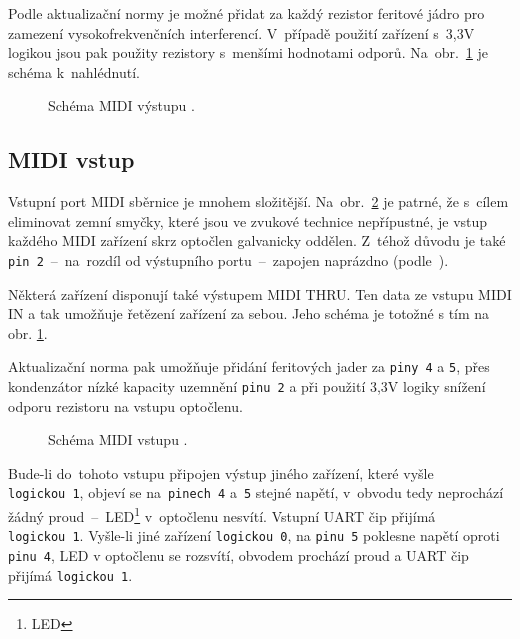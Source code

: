 Podle aktualizační normy \cite{MIDIupd} je možné přidat za každý rezistor feritové jádro pro zamezení vysokofrekvenčních interferencí. V~případě použití zařízení s~3,3\unit{V} logikou jsou pak použity rezistory s~menšími hodnotami odporů. Na~obr.~\ref{fig:schMIDIout} je schéma k~nahlédnutí.

\begin{figure}[h]
    \centering
    
    \caption{Schéma \acs{MIDI} výstupu \cite{MIDIspecs}.}
    \label{fig:schMIDIout}
\end{figure}

\subsection{MIDI vstup}



Vstupní port \acs{MIDI} sběrnice je mnohem složitější. Na~obr.~\ref{fig:schMIDIin} je patrné, že s~cílem eliminovat zemní smyčky, které jsou ve zvukové technice nepřípustné, je vstup každého \acs{MIDI} zařízení skrz optočlen galvanicky oddělen. Z~téhož důvodu je také \texttt{pin~2}~--~na~rozdíl od  výstupního portu~--~zapojen naprázdno (podle~\cite{MIDIspecs}). 

Některá zařízení disponují také výstupem \acs{MIDI} THRU. Ten  data ze vstupu \acs{MIDI} IN a tak umožňuje řetězení zařízení za sebou. Jeho schéma je totožné s tím na obr. \ref{fig:schMIDIout}.

Aktualizační norma \cite{MIDIupd} pak umožňuje přidání feritových jader za \texttt{piny~4} a \texttt{5}, přes kondenzátor nízké kapacity uzemnění \texttt{pinu~2} a při použití 3,3\unit{V} logiky snížení odporu rezistoru na vstupu optočlenu.

\begin{figure}[h]
    \centering
    
    \caption{Schéma MIDI vstupu \cite{MIDIspecs}.}
    \label{fig:schMIDIin}
\end{figure}

Bude-li do~tohoto vstupu připojen výstup jiného zařízení, které vyšle \linebreak \texttt{logickou~1}, objeví se na~\texttt{pinech~4} a~\texttt{5} stejné napětí, v~obvodu tedy neprochází žádný proud~--~\acs{LED}\footnote{\acl{LED}} v~optočlenu nesvítí. Vstupní UART čip přijímá \texttt{logickou~1}. Vyšle-li jiné zařízení \texttt{logickou~0}, na \texttt{pinu~5} poklesne napětí oproti \texttt{pinu~4}, \acs{LED} v optočlenu se rozsvítí, obvodem prochází proud a UART čip přijímá \texttt{logickou~1}.

